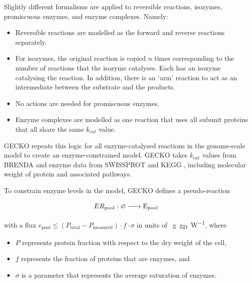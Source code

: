 
Slightly different formalisms are applied to reversible reactions, isozymes, promiscuous enzymes, and enzyme complexes.  Namely:
\begin{itemize}
  \item Reversible reactions are modelled as the forward and reverse reactions separately.
  \item For isozymes, the original reaction is copied $n$ times corresponding to the number of reactions that the isozyme catalyses. Each has an isozyme catalysing the reaction.
  In addition, there is an `arm' reaction to act as an intermediate between the substrate and the products.
  \item No actions are needed for promiscuous enzymes.
  \item Enzyme complexes are modelled as one reaction that uses all subunit proteins that all share the same $k_{cat}$ value.
\end{itemize}

GECKO repeats this logic for all enzyme-catalysed reactions in the genome-scale model to create an enzyme-constrained model.
GECKO takes $k_{cat}$ values from BRENDA \parencite{changBRENDAELIXIRCore2021} and enzyme data from SWISSPROT \parencite{theuniprotconsortiumUniProtUniversalProtein2023} and KEGG \parencite{kanehisaKEGGTaxonomybasedAnalysis2023}, including molecular weight of protein and associated pathways.

To constrain enzyme levels in the model, GECKO defines a pseudo-reaction

\begin{equation}
  ER_{\mathrm{pool}}: \varnothing \ce{ -> E_{pool} }
  \label{eq:model-gecko-enzyme-pool}
\end{equation}

with a flux $e_{\mathrm{pool}} \leq (P_{\mathrm{total}} - P_{\mathrm{measured}}) \cdot f \cdot \sigma$ in units of \SI{}{\gram~\gram_DW^{-1}}, where

\begin{itemize}
  \item $P$ represents protein fraction with respect to the dry weight of the cell,
  \item $f$ represents the fraction of proteins that are enzymes, and
  \item $\sigma$ is a parameter that represents the average saturation of enzymes.
\end{itemize}

